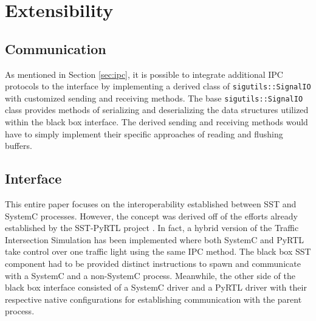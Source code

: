 \documentclass{article}
\begin{document}

  \section{Extensibility}

    \subsection{Communication}
    As mentioned in Section \ref{sec:ipc}, it is possible to integrate additional IPC protocols to
    the interface by implementing a derived class of \lstinline{sigutils::SignalIO} with customized
    sending and receiving methods. The base \lstinline{sigutils::SignalIO} class provides methods of
    serializing and deserializing the data structures utilized within the black box interface. The
    derived sending and receiving methods would have to simply implement their specific approaches
    of reading and flushing buffers.

    \subsection{Interface}
    This entire paper focuses on the interoperability established between SST and SystemC processes.
    However, the concept was derived off of the efforts already established by the SST-PyRTL project
    \cite{pyrtl-sst}. In fact, a hybrid version of the Traffic Intersection Simulation has been
    implemented where both SystemC and PyRTL take control over one traffic light using the same IPC
    method. The black box SST component had to be provided distinct instructions to spawn and
    communicate with a SystemC and a non-SystemC process. Meanwhile, the other side of the black box
    interface consisted of a SystemC driver and a PyRTL driver with their respective native
    configurations for establishing communication with the parent process.
\end{document}
